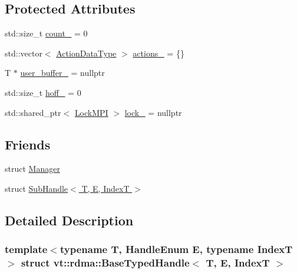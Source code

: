 \subsection*{Protected Attributes}
\begin{DoxyCompactItemize}
\item 
std\+::size\+\_\+t \hyperlink{structvt_1_1rdma_1_1_base_typed_handle_ac474123342ec5f8f82d2346b09331fc4}{count\+\_\+} = 0
\item 
std\+::vector$<$ \hyperlink{structvt_1_1rdma_1_1_base_typed_handle_a20c231fb671a38c3bb761d613dd42b3c}{Action\+Data\+Type} $>$ \hyperlink{structvt_1_1rdma_1_1_base_typed_handle_a448710fab012c50cd4eb02b955d2a240}{actions\+\_\+} = \{\}
\item 
T $\ast$ \hyperlink{structvt_1_1rdma_1_1_base_typed_handle_af48b31b6d8f1319ee58c5544ad251bf9}{user\+\_\+buffer\+\_\+} = nullptr
\item 
std\+::size\+\_\+t \hyperlink{structvt_1_1rdma_1_1_base_typed_handle_a009a2f6951b5a3284f1f19bb9b56e4e2}{hoff\+\_\+} = 0
\item 
std\+::shared\+\_\+ptr$<$ \hyperlink{structvt_1_1rdma_1_1_lock_m_p_i}{Lock\+M\+PI} $>$ \hyperlink{structvt_1_1rdma_1_1_base_typed_handle_accff417789be0a3556fdc4695aba5a85}{lock\+\_\+} = nullptr
\end{DoxyCompactItemize}
\subsection*{Friends}
\begin{DoxyCompactItemize}
\item 
struct \hyperlink{structvt_1_1rdma_1_1_base_typed_handle_a1fd6b9bc3f72bb2b64e602de3982929d}{Manager}
\item 
struct \hyperlink{structvt_1_1rdma_1_1_base_typed_handle_aa597d7381f8793417b0656cbaf1625f0}{Sub\+Handle$<$ T, E, Index\+T $>$}
\end{DoxyCompactItemize}


\subsection{Detailed Description}
\subsubsection*{template$<$typename T, Handle\+Enum E, typename IndexT$>$\newline
struct vt\+::rdma\+::\+Base\+Typed\+Handle$<$ T, E, Index\+T $>$}

